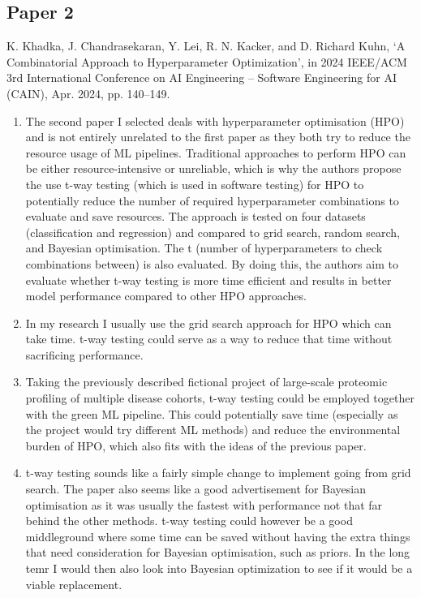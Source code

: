 \documentclass[11pt]{article}
\begin{document}
\begin{comment}
\end{comment}

\subsection{Paper 2}

K. Khadka, J. Chandrasekaran, Y. Lei, R. N. Kacker, and D. Richard Kuhn, ‘A Combinatorial Approach to Hyperparameter Optimization’, in 2024 IEEE/ACM 3rd International Conference on AI Engineering – Software Engineering for AI (CAIN), Apr. 2024, pp. 140–149.

\begin{enumerate}
    \item The second paper I selected deals with hyperparameter optimisation (HPO) and is not entirely unrelated to the first paper as they both try to reduce the resource usage of ML pipelines. Traditional approaches to perform HPO can be either resource-intensive or unreliable, which is why the authors propose the use t-way testing (which is used in software testing) for HPO to potentially reduce the number of required hyperparameter combinations to evaluate and save resources. The approach is tested on four datasets (classification and regression) and compared to grid search, random search, and Bayesian optimisation. The t (number of hyperparameters to check combinations between) is also evaluated. By doing this, the authors aim to evaluate whether t-way testing is more time efficient and results in better model performance compared to other HPO approaches. 
    
    \item In my research I usually use the grid search approach for HPO which can take time. t-way testing could serve as a way to reduce that time without sacrificing performance. 
    
    \item Taking the previously described fictional project of large-scale proteomic profiling of multiple disease cohorts, t-way testing could be employed together with the green ML pipeline. This could potentially save time (especially as the project would try different ML methods) and reduce the environmental burden of HPO, which also fits with the ideas of the previous paper.
    
    \item t-way testing sounds like a fairly simple change to implement going from grid search. The paper also seems like a good advertisement for Bayesian optimisation as it was usually the fastest with performance not that far behind the other methods. t-way testing could however be a good middleground where some time can be saved without having the extra things that need consideration for Bayesian optimisation, such as priors. In the long temr I would then also look into Bayesian optimization to see if it would be a viable replacement.
\end{enumerate}
\end{document}

